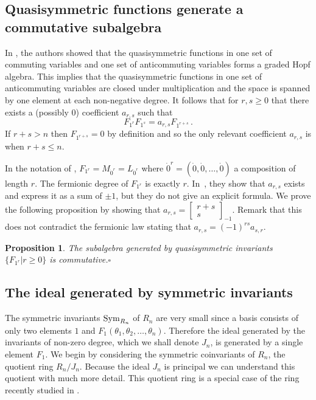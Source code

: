 \documentclass[submission]{FPSAC2023}
\newtheorem{prop}[theorem]{Proposition}
\theoremstyle{definition}
\numberwithin{equation}{section}
\newcommand{\qbinom}[2]{\left[ \begin{smallmatrix}#1\\#2\end{smallmatrix} \right]}
\begin{document}
\subsection{Quasisymmetric functions generate a commutative subalgebra}
In \cite{FLP}, the authors showed that the quasisymmetric functions in
one set of commuting variables and one set of anticommuting variables
forms a graded Hopf algebra.  This implies that the quasisymmetric functions
in one set of anticommuting variables are closed under multiplication
and the space is spanned by one element at each non-negative degree.
It follows that for $r, s \geq0$ that there exists a (possibly $0$)
coefficient $a_{r,s}$ such that
\begin{equation}\label{eq:qsalg}
F_{1^r} F_{1^s} = a_{r,s} F_{1^{r+s}}\,.
\end{equation}
If $r+s>n$ then $F_{1^{r+s}} = 0$ by definition and so the only relevant coefficient $a_{r,s}$ is when
$r+s \leq n$.

In the notation of \cite{FLP}, $F_{1^r}=M_{\dot{0}^r}=L_{\dot{0}^r}$ where $\dot{0}^r=(\dot{0},\dot{0},\ldots,\dot{0})$ a composition of length $r$. The fermionic degree of $F_{1^r}$ is exactly $r$. In~\cite{FLP}, they show that $a_{r,s}$ exists and express it as a sum of $\pm 1$, but they do not give an explicit formula. We prove the following proposition by showing that $a_{r,s} = \qbinom{r+s}{s}_{-1}$. Remark that this does not contradict the fermionic law stating that $a_{r,s} = (-1)^{rs} a_{s,r}$.

\begin{prop} \label{prop:comm}
The subalgebra generated by quasisymmetric invariants $\{F_{1^r}|r\ge 0\}$ is commutative.\hfill$\square$
\end{prop}

\subsection{The ideal generated by symmetric invariants}
The symmetric invariants ${\rm Sym}_{R_n}$ of $R_n$ are very small since a basis consists of only two
elements $1$ and $F_1(\theta_1, \theta_2, \ldots, \theta_n)$.  Therefore the ideal generated by the invariants of non-zero
degree, which we shall denote $J_n$, is generated by a single element
$F_1$.
We begin by considering the symmetric
coinvariants of $R_n$, the quotient ring $R_n/J_n$.
Because the ideal $J_n$ is principal we can
understand this quotient with much more detail.
This quotient ring is a special case of the ring
recently studied in \cite{IRR,KR}.
\end{document}
